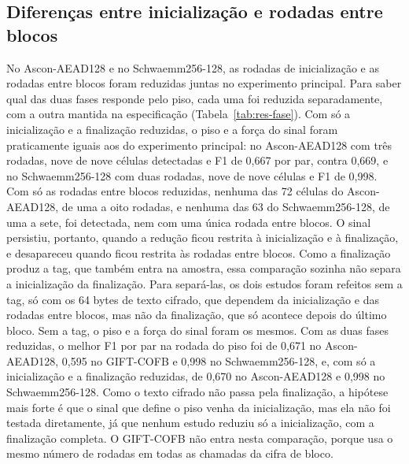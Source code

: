 \subsection{Diferenças entre inicialização e rodadas entre blocos}
\label{sec:res-fase}

No Ascon-AEAD128 e no Schwaemm256-128, as rodadas de inicialização e as rodadas entre blocos foram reduzidas juntas no experimento principal. Para saber qual das duas fases responde pelo piso, cada uma foi reduzida separadamente, com a outra mantida na especificação (Tabela~\ref{tab:res-fase}). Com só a inicialização e a finalização reduzidas, o piso e a força do sinal foram praticamente iguais aos do experimento principal: no Ascon-AEAD128 com três rodadas, nove de nove células detectadas e F1 de 0,667 por par, contra 0,669, e no Schwaemm256-128 com duas rodadas, nove de nove células e F1 de 0,998. Com só as rodadas entre blocos reduzidas, nenhuma das 72 células do Ascon-AEAD128, de uma a oito rodadas, e nenhuma das 63 do Schwaemm256-128, de uma a sete, foi detectada, nem com uma única rodada entre blocos. O sinal persistiu, portanto, quando a redução ficou restrita à inicialização e à finalização, e desapareceu quando ficou restrita às rodadas entre blocos. Como a finalização produz a tag, que também entra na amostra, essa comparação sozinha não separa a inicialização da finalização. Para separá-las, os dois estudos foram refeitos sem a tag, só com os 64 bytes de texto cifrado, que dependem da inicialização e das rodadas entre blocos, mas não da finalização, que só acontece depois do último bloco. Sem a tag, o piso e a força do sinal foram os mesmos. Com as duas fases reduzidas, o melhor F1 por par na rodada do piso foi de 0,671 no Ascon-AEAD128, 0,595 no GIFT-COFB e 0,998 no Schwaemm256-128, e, com só a inicialização e a finalização reduzidas, de 0,670 no Ascon-AEAD128 e 0,998 no Schwaemm256-128. Como o texto cifrado não passa pela finalização, a hipótese mais forte é que o sinal que define o piso venha da inicialização, mas ela não foi testada diretamente, já que nenhum estudo reduziu só a inicialização, com a finalização completa. O GIFT-COFB não entra nesta comparação, porque usa o mesmo número de rodadas em todas as chamadas da cifra de bloco.

